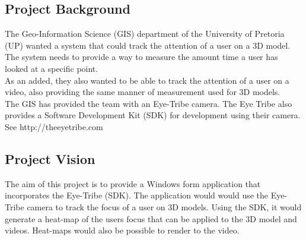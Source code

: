 \subsection{Project Background}
The Geo-Information Science (GIS) department of the University of Pretoria (UP) wanted a system that could track the attention of a user on a 3D model. The system needs to provide a way to measure the amount time a user has looked at a specific point.\\
As an added, they also wanted to be able to track the attention of a user on a video, also providing the same manner of measurement used for 3D models.\\
The GIS has provided the team with an Eye-Tribe camera. The Eye Tribe also provides a Software Development Kit (SDK) for development using their camera.\\
See http://theeyetribe.com

\subsection{Project Vision}
The aim of this project is to provide a Windows form application that incorporates the Eye-Tribe (SDK). The application would would use the Eye-Tribe camera to track the focus of a user on 3D models. Using the SDK, it would generate a heat-map of the users focus that can be applied to the 3D model and videos. Heat-maps would also be possible to render to the video.
